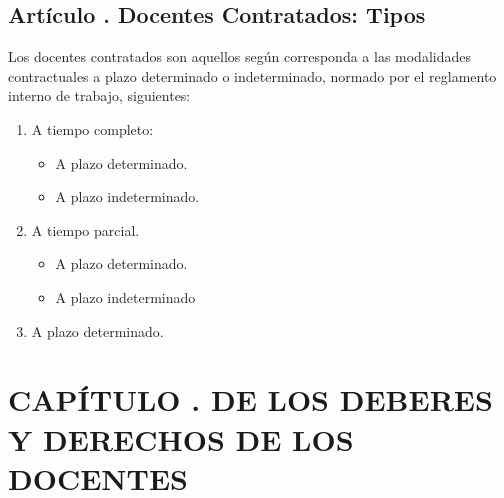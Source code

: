 \subsection{Artículo . Docentes Contratados: Tipos}
\addtocounter{ns}{1}
Los docentes contratados son aquellos según corresponda a las modalidades contractuales a plazo determinado o indeterminado, normado por el reglamento interno de trabajo, siguientes:  
\begin{enumerate}
\item A tiempo completo: 
\begin{itemize}
\item A plazo determinado. 
\item A plazo indeterminado.
\end{itemize}
 
\item A tiempo parcial.
\begin{itemize}
\item A plazo determinado. 
\item A plazo indeterminado 
\end{itemize} 
\item A plazo determinado. 
\end{enumerate}
\section{CAPÍTULO . DE LOS DEBERES Y DERECHOS DE LOS DOCENTES}
\addtocounter{re}{1}

